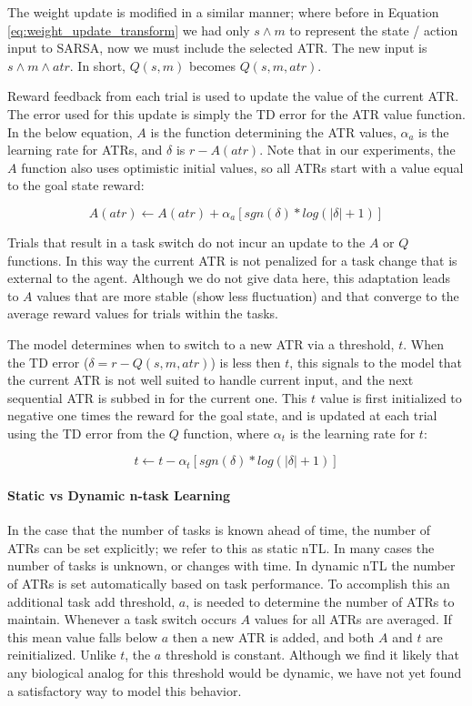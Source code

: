 \documentclass[10pt,letterpaper]{article}
\begin{document}
\noindent The weight update is modified in a similar manner; where before in Equation \ref{eq:weight_update_transform} we had only $s \wedge m$ to represent the state / action input to SARSA, now we must include the selected ATR. The new input is $s \wedge m \wedge atr$. In short, $Q(s,m)$ becomes $Q(s,m,atr)$.

Reward feedback from each trial is used to update the value of the current ATR. The error used for this update is simply the TD error for the ATR value function. In the below equation, $A$ is the function determining the ATR values, $ \alpha_a $ is the learning rate for ATRs, and $\delta$ is $r - A(atr)$. Note that in our experiments, the $A$ function also uses optimistic initial values, so all ATRs start with a value equal to the goal state reward:

\begin{equation}
A(atr) \leftarrow A(atr) + \alpha_a [sgn(\delta) * log(|\delta| + 1)]
\label{eq:a_function_update}
\end{equation}

Trials that result in a task switch do not incur an update to the $A$ or $Q$ functions. In this way the current ATR is not penalized for a task change that is external to the agent. Although we do not give data here, this adaptation leads to $ A $ values that are more stable (show less fluctuation) and that converge to the average reward values for trials within the tasks.

The model determines when to switch to a new ATR via a threshold, $ t $. When the TD error ($\delta=r-Q(s,m,atr)$) is less then $ t $, this signals to the model that the current ATR is not well suited to handle current input, and the next sequential ATR is subbed in for the current one. This $t$ value is first initialized to negative one times the reward for the goal state, and is updated at each trial using the TD error from the $Q$ function, where $ \alpha_t $ is the learning rate for $t$:

\begin{equation}
t \leftarrow t - \alpha_t [sgn(\delta) * log(|\delta| + 1)]
\label{eq:t_update}
\end{equation}

\paragraph{Static vs Dynamic n-task Learning}

In the case that the number of tasks is known ahead of time, the number of ATRs can be set explicitly; we refer to this as static nTL. In many cases the number of tasks is unknown, or changes with time. In dynamic nTL the number of ATRs is set automatically based on task performance. To accomplish this an additional task add threshold, $a$, is needed to determine the number of ATRs to maintain. Whenever a task switch occurs $ A $ values for all ATRs are averaged. If this mean value falls below $ a $ then a new ATR is added, and both $ A $ and $ t $ are reinitialized. Unlike $ t $, the $ a $ threshold is constant. Although we find it likely that any biological analog for this threshold would be dynamic, we have not yet found a satisfactory way to model this behavior.
\end{document}
